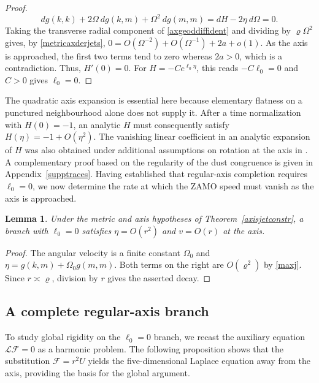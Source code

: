\documentclass[amsmath,amsfonts,amssymb,aps,pra,superscriptaddress,10pt]{revtex4-2}
\numberwithin{equation}{section}
\theoremstyle{plain}
\newtheorem{lemma}{Lemma}
\theoremstyle{definition}
\theoremstyle{remark}
\theoremstyle{definition}
\newcommand{\ellzero}{\ell_0}
\begin{document}
\begin{proof}
\begin{equation}\label{axgeoddiffident}
dg(k,k)+2\Omega~dg(k,m)+\Omega^2~dg(m,m)=dH-2\eta~d\Omega=0.
\end{equation}
Taking the transverse radial component of \eqref{axgeoddiffident} and dividing by $\varrho\Omega^2$ gives, by \eqref{metricaxderjets}, $0=O(\Omega^{-2})+O(\Omega^{-1})+2a+o(1)$. As the axis is approached, the first two terms tend to zero whereas $2a>0$, which is a contradiction. Thus, $H'(0)=0$. For $H=-Ce^{\ellzero\eta}$, this reads $-C\ellzero=0$ and $C>0$ gives $\ellzero=0$.
\end{proof}

The quadratic axis expansion is essential here because elementary flatness on a punctured neighbourhood alone does not supply it. After a time
normalization with $H(0)=-1$, an analytic $H$ must consequently satisfy
$H(\eta)=-1+O(\eta^2)$. The vanishing linear coefficient in an analytic expansion of $H$ was also obtained under additional assumptions on rotation at the axis in \cite{Galoppo2025EPJC}. A complementary proof based on the regularity of the dust congruence is given in Appendix~\ref{supptraces}. Having established that regular-axis completion requires $\ellzero=0$, we now determine the rate at which the ZAMO speed must vanish as the axis is approached.

\begin{lemma}\label{axisvzero}
Under the metric and axis hypotheses of Theorem~\ref{axisjetconstr}, a branch with $\ellzero=0$ satisfies $\eta=O(r^2)$ and $v=O(r)$ at the axis.
\end{lemma}

\begin{proof}
The angular velocity is a finite constant $\Omega_0$ and $\eta=g(k,m)+\Omega_0 g(m,m)$. Both terms on the right are $O(\varrho^2)$ by
\eqref{maxj}. Since $r\asymp\varrho$, division by $r$ gives the asserted decay.
\end{proof}

\subsection{A complete regular-axis branch}

To study global rigidity on the $\ellzero=0$ branch, we recast the auxiliary equation $\mathcal{L}\mathcal{F}=0$ as a harmonic problem. The following proposition shows that the substitution $\mathcal{F}=r^2 U$ yields the five-dimensional Laplace equation away from the axis, providing the basis for the global argument.
\end{document}
